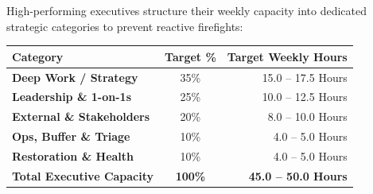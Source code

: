 \documentclass[10pt, landscape]{article}
\begin{document}

\vspace{0.55in}

\begin{minipage}[t]{0.48\linewidth}

  \begin{tcolorbox}[execbox, title={\faChartPie~ IDEAL EXECUTIVE TIME AUDIT BREAKDOWN}]
    \small
    High-performing executives structure their weekly capacity into dedicated strategic categories to prevent reactive firefights:

    \vspace{4pt}
    \begin{tabularx}{\linewidth}{X c r}
      \hline
      \textbf{Category} & \textbf{Target \%} & \textbf{Target Weekly Hours} \\
      \hline
      \textbf{\color{DeepWorkTxt}Deep Work / Strategy} & 35\% & 15.0 -- 17.5 Hours \\
      \textbf{\color{MeetingTxt}Leadership \& 1-on-1s} & 25\% & 10.0 -- 12.5 Hours \\
      \textbf{\color{ClientTxt}External \& Stakeholders} & 20\% & 8.0 -- 10.0 Hours \\
      \textbf{\color{AdminTxt}Ops, Buffer \& Triage} & 10\% & 4.0 -- 5.0 Hours \\
      \textbf{\color{PersonalTxt}Restoration \& Health} & 10\% & 4.0 -- 5.0 Hours \\
      \hline
      \textbf{Total Executive Capacity} & \textbf{100\%} & \textbf{45.0 -- 50.0 Hours} \\
      \hline
    \end{tabularx}
  \end{tcolorbox}

  \vspace{4pt}


\end{minipage}
\end{document}
